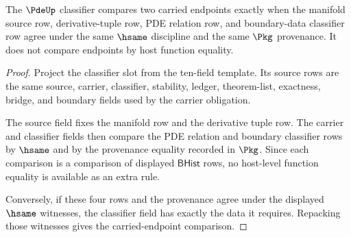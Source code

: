\begin{theorem}
\label{thm:pde-classifier-obligation}
The $\PdeUp$ classifier compares two carried endpoints exactly when the
manifold source row, derivative-tuple row, PDE relation row, and
boundary-data classifier row agree under the same $\hsame$ discipline and the
same $\Pkg$ provenance. It does not compare endpoints by host function
equality.
\end{theorem}
\begin{proof}
Project the classifier slot from the ten-field template. Its source rows are
the same source, carrier, classifier, stability, ledger, theorem-list,
exactness, bridge, and boundary fields used by the carrier obligation.

The source field fixes the manifold row and the derivative tuple row. The
carrier and classifier fields then compare the PDE relation and boundary
classifier rows by $\hsame$ and by the provenance equality recorded in
$\Pkg$. Since each comparison is a comparison of displayed $\mathsf{BHist}$
rows, no host-level function equality is available as an extra rule.

Conversely, if these four rows and the provenance agree under the displayed
$\hsame$ witnesses, the classifier field has exactly the data it requires.
Repacking those witnesses gives the carried-endpoint comparison.
\end{proof}

